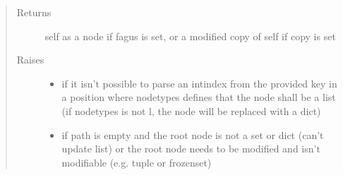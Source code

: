 \documentclass[a4paper,10pt,english]{sphinxmanual}
\begin{document}
\begin{fulllineitems}
\begin{fulllineitems}
\begin{quote}
\begin{description}
\begin{itemize}
\end{itemize}

\item[{Returns}] \leavevmode
\sphinxAtStartPar
self as a node if fagus is set, or a modified copy of self if copy is set

\item[{Raises}] \leavevmode\begin{itemize}
\item {}
\sphinxAtStartPar
{} \textendash{} if it isn’t possible to parse an int\sphinxhyphen{}index from the provided key in a position where node\sphinxhyphen{}types
    defines that the node shall be a list (if node\sphinxhyphen{}types is not l, the node will be replaced with a dict)

\item {}
\sphinxAtStartPar
{} \textendash{} if path is empty and the root node is not a set or dict (can’t update list) or the root node
    needs to be modified and isn’t modifiable (e.g. tuple or frozenset)

\end{itemize}

\end{description}\end{quote}

\end{fulllineitems}



\end{fulllineitems}
\end{document}
